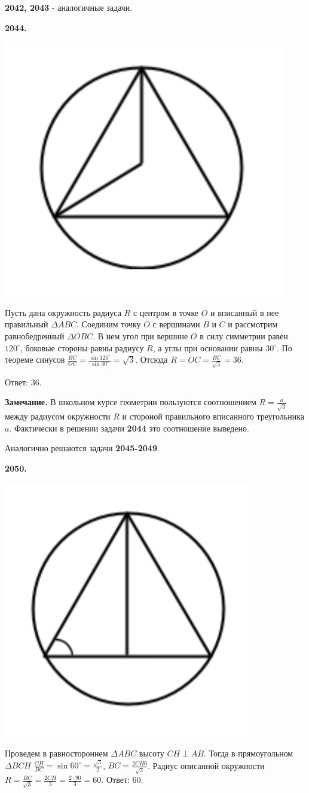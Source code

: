 \textbf{2042, 2043} - аналогичные задачи.


\textbf{2044.}

{\centering \includegraphics[width=0.4\linewidth]{Geometry/Content/34.png}
	
}

Пусть дана окружность радиуса $R$ с центром в точке $O$ и  вписанный в нее правильный $\Delta ABC$.  Соединим точку $O$ с вершинами $B$ и $C$ и рассмотрим равнобедренный $\Delta OBC$. В нем угол при вершине $O$ в силу симметрии равен $120^\circ$, боковые стороны равны радиусу $R$, а углы при основании равны $30^\circ$. По теореме синусов $\frac{BC}{OC} = \frac{\sin{120^\circ}}{\sin{30^\circ}} = \sqrt{3}$. Отсюда $R = OC = \frac{BC}{\sqrt{3}} = 36$. 

\null \hspace*{\fill} Ответ: 36.

\textbf{Замечание.} В школьном курсе геометрии пользуются соотношением $R = \frac{a}{\sqrt{3}}$ между радиусом окружности $R$ и стороной правильного вписанного треугольника $a$. Фактически в решении задачи \textbf{2044} это соотношение выведено. 

Аналогично решаются задачи \textbf{2045-2049}.

\textbf{2050.}  

{\centering \includegraphics[width=0.4\linewidth]{Geometry/Content/35.png}
	
}

Проведем в равностороннем $\Delta ABC$ высоту $CH \perp AB$. Тогда в прямоугольном $\Delta BCH$ $\frac{CH}{BC} = \sin{60^\circ} = \frac{\sqrt{3}}{2}$, $BC = \frac{2CH0}{\sqrt{3}}$. Радиус описанной окружности $R = \frac{BC}{\sqrt{3}} = \frac{2CH}{3} = \frac{2\cdot 90}{3} = 60.$ \newline \null \hspace*{\fill} Ответ: 60.

